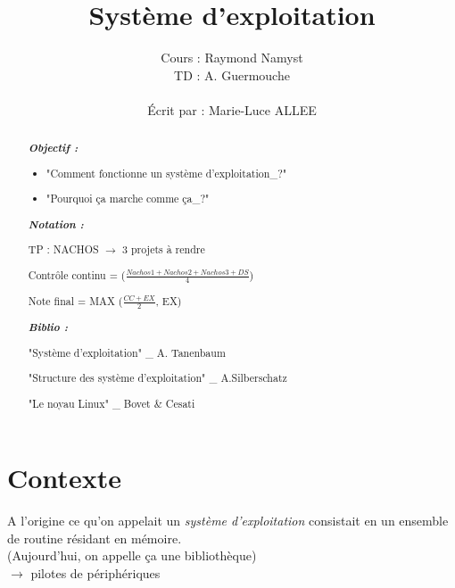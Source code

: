 \documentclass[12pt,a4paper]{report}
\begin{document}
\title{Système d'exploitation\\}
\author{Cours : Raymond Namyst \\ TD : A. Guermouche\\\\ Écrit par : Marie-Luce ALLEE\\}
\maketitle

\begin{abstract}

\textbf{\textit{Objectif :}} \\
\begin{itemize}
\item "Comment fonctionne un système d'exploitation_?"
\item "Pourquoi ça marche comme ça_?"
\end{itemize}

\vspace*{2cm}

\textbf{\textit{Notation :} }\\
\begin{description}
\item TP : NACHOS $\rightarrow$ 3 projets à rendre
\item Contrôle continu = ($\frac{Nachos 1 + Nachos 2+ Nachos 3 + DS}{4}$)
\item Note final = MAX ($\frac{CC + EX}{2}$, EX)
\end{description}

\vspace*{2 cm}

\textbf{\textit{Biblio :} }\\
\begin{description}
\item "Système d'exploitation"  \_ A. Tanenbaum
\item "Structure des système d'exploitation" \_ A.Silberschatz
\item "Le noyau Linux" \_ Bovet \& Cesati
\end{description}

\end{abstract}

\tableofcontents
\newpage

\section*{Contexte}
A l'origine ce qu'on appelait un \textit{système d'exploitation} consistait en un ensemble de routine résidant en mémoire.\\
(Aujourd'hui, on appelle ça une bibliothèque)\\
$\rightarrow$ pilotes de périphériques\\
\end{document}
